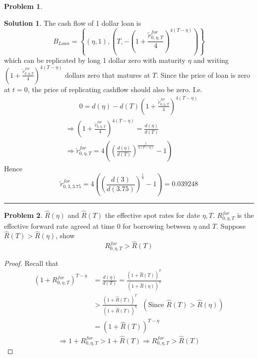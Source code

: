 \documentclass[a4paper, 10pt]{article}
\theoremstyle{definition}
\newtheorem{problem}{Problem}
\theoremstyle{hSol}
\newtheorem*{solution}{Solution}
\begin{document}
\begin{problem} 
\end{problem}
\begin{solution} The cash flow of 1 dollar loan is 
$$B_{Loan} = \left\{(\eta, 1), \left(T, -\left(1+\frac{\tilde{r}^{for}_{0, \eta, T}}{4}\right)^{4(T-\eta)}\right)\right\}$$
which can be replicated by long 1 dollar zero with maturity $\eta$ and writing $\left(1+\frac{\tilde{r}^{for}_{0, \eta, T}}{4}\right)^{4(T-\eta)}$ dollars zero that matures at $T$. Since the price of loan is zero at $t=0$, the price of replicating cashflow should also be zero. I.e.
\begin{equation}
  \begin{split}
    &\qquad 0 = d(\eta) - d(T) \left(1+\frac{\tilde{r}^{for}_{0, \eta, T}}{4}\right)^{4(T-\eta)}\\
    & \Rightarrow \left(1+\frac{\tilde{r}^{for}_{0, \eta, T}}{4}\right)^{4(T-\eta)} = \frac{d(\eta)}{d(T)} \\
    & \Rightarrow \tilde{r}^{for}_{0, \eta, T} = 4\left(\left(\frac{d(\eta)}{d(T)}\right)^{\frac{1}{4(T-\eta)}} - 1\right)
  \end{split}
\end{equation}
Hence
\begin{equation}
  \tilde{r}^{for}_{0, 3, 3.75} = 4\left(\left(\frac{d(3)}{d(3.75)}\right)^{\frac{1}{3}} - 1\right) = 0.039248
\end{equation}
\end{solution}
\noindent\rule{16cm}{0.4pt}

\begin{problem} $\hat{R}(\eta)$ and $\hat{R}(T)$ the effective spot rates for date $\eta, T$. $R^{for}_{0, \eta, T}$ is the effective forward rate agreed at time $0$ for borrowing between $\eta$ and $T$. Suppose $\hat{R}(T) > \hat{R}(\eta)$, show
$$
R^{for}_{0, \eta, T} > \hat{R}(T)
$$
\end{problem}
\begin{proof} Recall that
\begin{equation}
  \begin{split}
  (1+R^{for}_{0, \eta, T})^{T-\eta} &= \frac{d(\eta)}{d(T)} = \frac{(1+\hat{R}(T))^{T}}{(1+\hat{R}(\eta))^\eta} \\
  &> \frac{(1+\hat{R}(T))^{T}}{(1+\hat{R}(T))^\eta} ~~~(\text{Since }\hat{R}(T) > \hat{R}(\eta)) \\
  &= (1+\hat{R}(T))^{T-\eta}
  \end{split}
\end{equation}
$$
\Rightarrow 1+ R^{for}_{0, \eta, T} > 1+\hat{R}(T) \Rightarrow R^{for}_{0, \eta, T} > \hat{R}(T)
$$
\end{proof}
\end{document}
